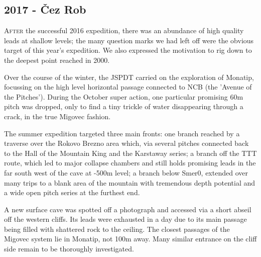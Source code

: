 \newpage
  
\begin{tcolorbox}

\chapter{2017 - Čez Rob}
	
	\lettrine{A}{fter} the successful 2016 expedition, there was an abundance of high quality leads at shallow levels; the many question marks we had left off were the obvious target of this year's expedition. We also expressed the motivation to rig down to the deepest point reached in 2000.

	Over the course of the winter, the JSPDT carried on the exploration of Monatip, focussing on the high level horizontal passage connected to NCB (the 'Avenue of the Pitches'). During the October super action, one particular promising 60m pitch was dropped, only to find a tiny trickle of water disappearing through a crack, in the true Migovec fashion.

	The summer expedition targeted three main fronts: one branch reached by a traverse over the Rokovo Brezno area which, via several pitches connected back to the Hall of the Mountain King and the Karstaway series; a branch off the TTT route, which led to major collapse chambers and still holds promising leads in the far south west of the cave at -500m level; a branch below Smer0, extended over many trips to a blank area of the mountain with tremendous depth potential and a wide open pitch series at the furthest end.

	A new surface cave was spotted off a photograph and accessed via a short abseil off the western cliffs. Its leads were exhausted in a day due to its main passage being filled with shattered rock to the ceiling. The closest passages of the Migovec system lie in Monatip, not 100m away. Many similar entrance on the cliff side remain to be thoroughly investigated.
	\\
	\\
	\\
\end{tcolorbox}

